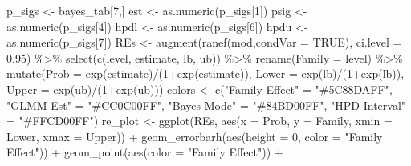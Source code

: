 \documentclass[
]{article}
\newenvironment{Shaded}{\begin{snugshade}}{\end{snugshade}}
\newcommand{\AttributeTok}[1]{\textcolor[rgb]{0.77,0.63,0.00}{#1}}
\newcommand{\ConstantTok}[1]{\textcolor[rgb]{0.00,0.00,0.00}{#1}}
\newcommand{\DecValTok}[1]{\textcolor[rgb]{0.00,0.00,0.81}{#1}}
\newcommand{\FloatTok}[1]{\textcolor[rgb]{0.00,0.00,0.81}{#1}}
\newcommand{\FunctionTok}[1]{\textcolor[rgb]{0.00,0.00,0.00}{#1}}
\newcommand{\NormalTok}[1]{#1}
\newcommand{\OtherTok}[1]{\textcolor[rgb]{0.56,0.35,0.01}{#1}}
\newcommand{\SpecialCharTok}[1]{\textcolor[rgb]{0.00,0.00,0.00}{#1}}
\newcommand{\StringTok}[1]{\textcolor[rgb]{0.31,0.60,0.02}{#1}}
\begin{document}
\begin{Shaded}
\begin{Highlighting}[]
\NormalTok{p\_sigs }\OtherTok{\textless{}{-}}\NormalTok{ bayes\_tab[}\DecValTok{7}\NormalTok{,]}
\NormalTok{est }\OtherTok{\textless{}{-}} \FunctionTok{as.numeric}\NormalTok{(p\_sigs[}\DecValTok{1}\NormalTok{])}
\NormalTok{psig }\OtherTok{\textless{}{-}} \FunctionTok{as.numeric}\NormalTok{(p\_sigs[}\DecValTok{4}\NormalTok{])}
\NormalTok{hpdl }\OtherTok{\textless{}{-}} \FunctionTok{as.numeric}\NormalTok{(p\_sigs[}\DecValTok{6}\NormalTok{])}
\NormalTok{hpdu }\OtherTok{\textless{}{-}} \FunctionTok{as.numeric}\NormalTok{(p\_sigs[}\DecValTok{7}\NormalTok{])}
\NormalTok{REs }\OtherTok{\textless{}{-}} \FunctionTok{augment}\NormalTok{(}\FunctionTok{ranef}\NormalTok{(mod,}\AttributeTok{condVar =} \ConstantTok{TRUE}\NormalTok{), }\AttributeTok{ci.level =} \FloatTok{0.95}\NormalTok{) }\SpecialCharTok{\%\textgreater{}\%}
  \FunctionTok{select}\NormalTok{(}\FunctionTok{c}\NormalTok{(level, estimate, lb, ub)) }\SpecialCharTok{\%\textgreater{}\%}
  \FunctionTok{rename}\NormalTok{(}\AttributeTok{Family =}\NormalTok{ level) }\SpecialCharTok{\%\textgreater{}\%}
  \FunctionTok{mutate}\NormalTok{(}\AttributeTok{Prob =} \FunctionTok{exp}\NormalTok{(estimate)}\SpecialCharTok{/}\NormalTok{(}\DecValTok{1}\SpecialCharTok{+}\FunctionTok{exp}\NormalTok{(estimate)),}
         \AttributeTok{Lower =} \FunctionTok{exp}\NormalTok{(lb)}\SpecialCharTok{/}\NormalTok{(}\DecValTok{1}\SpecialCharTok{+}\FunctionTok{exp}\NormalTok{(lb)),}
         \AttributeTok{Upper =} \FunctionTok{exp}\NormalTok{(ub)}\SpecialCharTok{/}\NormalTok{(}\DecValTok{1}\SpecialCharTok{+}\FunctionTok{exp}\NormalTok{(ub)))}
\NormalTok{colors }\OtherTok{\textless{}{-}} \FunctionTok{c}\NormalTok{(}\StringTok{"Family Effect"} \OtherTok{=} \StringTok{"\#5C88DAFF"}\NormalTok{, }\StringTok{"GLMM Est"} \OtherTok{=} \StringTok{"\#CC0C00FF"}\NormalTok{, }\StringTok{"Bayes Mode"} \OtherTok{=} \StringTok{"\#84BD00FF"}\NormalTok{,}
            \StringTok{"HPD Interval"} \OtherTok{=} \StringTok{"\#FFCD00FF"}\NormalTok{)}
\NormalTok{re\_plot }\OtherTok{\textless{}{-}} \FunctionTok{ggplot}\NormalTok{(REs, }\FunctionTok{aes}\NormalTok{(}\AttributeTok{x =}\NormalTok{ Prob, }\AttributeTok{y =}\NormalTok{ Family, }\AttributeTok{xmin =}\NormalTok{ Lower, }\AttributeTok{xmax =}\NormalTok{ Upper)) }\SpecialCharTok{+}
  \FunctionTok{geom\_errorbarh}\NormalTok{(}\FunctionTok{aes}\NormalTok{(}\AttributeTok{height =} \DecValTok{0}\NormalTok{, }\AttributeTok{color =} \StringTok{"Family Effect"}\NormalTok{)) }\SpecialCharTok{+}
  \FunctionTok{geom\_point}\NormalTok{(}\FunctionTok{aes}\NormalTok{(}\AttributeTok{color =} \StringTok{"Family Effect"}\NormalTok{)) }\SpecialCharTok{+}

\end{Highlighting}
\end{Shaded}
\end{document}
